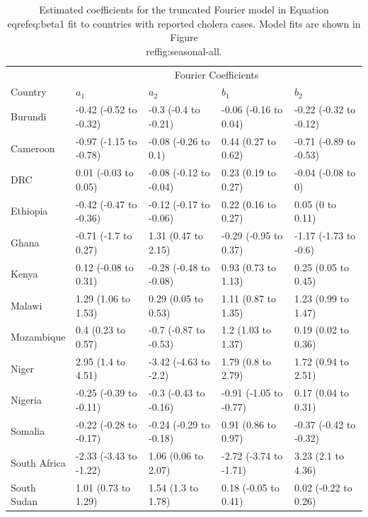\documentclass[
]{book}
\begin{document}
\begin{table}[!h]
\centering
\caption{\label{tab:seasonal-table}Estimated coefficients for the truncated Fourier model in Equation \\eqref{eq:beta1} fit to countries with reported cholera cases. Model fits are shown in Figure \\ref{fig:seasonal-all}.}
\centering
\fontsize{11.75}{13.75}\selectfont
\begin{tabular}[t]{l|l|l|l|l}
\hline
\multicolumn{1}{c|}{ } & \multicolumn{4}{c}{Fourier Coefficients} \\
\cline{2-5}
Country & $a_1$ & $a_2$ & $b_1$ & $b_2$\\
\hline
Burundi & -0.42 (-0.52 to -0.32) & -0.3 (-0.4 to -0.21) & -0.06 (-0.16 to 0.04) & -0.22 (-0.32 to -0.12)\\
\hline
Cameroon & -0.97 (-1.15 to -0.78) & -0.08 (-0.26 to 0.1) & 0.44 (0.27 to 0.62) & -0.71 (-0.89 to -0.53)\\
\hline
DRC & 0.01 (-0.03 to 0.05) & -0.08 (-0.12 to -0.04) & 0.23 (0.19 to 0.27) & -0.04 (-0.08 to 0)\\
\hline
Ethiopia & -0.42 (-0.47 to -0.36) & -0.12 (-0.17 to -0.06) & 0.22 (0.16 to 0.27) & 0.05 (0 to 0.11)\\
\hline
Ghana & -0.71 (-1.7 to 0.27) & 1.31 (0.47 to 2.15) & -0.29 (-0.95 to 0.37) & -1.17 (-1.73 to -0.6)\\
\hline
Kenya & 0.12 (-0.08 to 0.31) & -0.28 (-0.48 to -0.08) & 0.93 (0.73 to 1.13) & 0.25 (0.05 to 0.45)\\
\hline
Malawi & 1.29 (1.06 to 1.53) & 0.29 (0.05 to 0.53) & 1.11 (0.87 to 1.35) & 1.23 (0.99 to 1.47)\\
\hline
Mozambique & 0.4 (0.23 to 0.57) & -0.7 (-0.87 to -0.53) & 1.2 (1.03 to 1.37) & 0.19 (0.02 to 0.36)\\
\hline
Niger & 2.95 (1.4 to 4.51) & -3.42 (-4.63 to -2.2) & 1.79 (0.8 to 2.79) & 1.72 (0.94 to 2.51)\\
\hline
Nigeria & -0.25 (-0.39 to -0.11) & -0.3 (-0.43 to -0.16) & -0.91 (-1.05 to -0.77) & 0.17 (0.04 to 0.31)\\
\hline
Somalia & -0.22 (-0.28 to -0.17) & -0.24 (-0.29 to -0.18) & 0.91 (0.86 to 0.97) & -0.37 (-0.42 to -0.32)\\
\hline
South Africa & -2.33 (-3.43 to -1.22) & 1.06 (0.06 to 2.07) & -2.72 (-3.74 to -1.71) & 3.23 (2.1 to 4.36)\\
\hline
South Sudan & 1.01 (0.73 to 1.29) & 1.54 (1.3 to 1.78) & 0.18 (-0.05 to 0.41) & 0.02 (-0.22 to 0.26)\\

\end{tabular}
\end{table}
\end{document}
